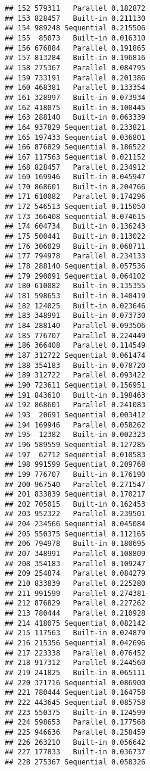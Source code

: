 \documentclass[
]{article}
\begin{document}
\begin{verbatim}
## 152 579311   Parallel 0.182872
## 153 828457   Built-in 0.211130
## 154 989248 Sequential 0.215506
## 155  85073   Built-in 0.016310
## 156 676884   Parallel 0.191865
## 157 813284   Built-in 0.196816
## 158 275367   Parallel 0.084795
## 159 733191   Parallel 0.201386
## 160 468381   Parallel 0.133354
## 161 328997   Built-in 0.073934
## 162 418075   Built-in 0.100445
## 163 288140   Built-in 0.063339
## 164 937829 Sequential 0.233821
## 165 197433 Sequential 0.036801
## 166 876829 Sequential 0.186522
## 167 117563 Sequential 0.021152
## 168 828457   Parallel 0.234912
## 169 169946   Built-in 0.045947
## 170 868601   Built-in 0.204766
## 171 610082   Parallel 0.174296
## 172 546513 Sequential 0.115050
## 173 366408 Sequential 0.074615
## 174 604734   Built-in 0.136243
## 175 500441   Built-in 0.113022
## 176 306029   Built-in 0.068711
## 177 794978   Parallel 0.234133
## 178 288140 Sequential 0.057536
## 179 290091 Sequential 0.064102
## 180 610082   Built-in 0.135355
## 181 598653   Built-in 0.140419
## 182 124025   Built-in 0.023646
## 183 348991   Built-in 0.073730
## 184 288140   Parallel 0.093506
## 185 776707   Parallel 0.224449
## 186 366408   Parallel 0.114549
## 187 312722 Sequential 0.061474
## 188 354183   Built-in 0.078720
## 189 312722   Parallel 0.093422
## 190 723611 Sequential 0.156951
## 191 843610   Built-in 0.198463
## 192 868601   Parallel 0.241083
## 193  20691 Sequential 0.003412
## 194 169946   Parallel 0.058262
## 195  12382   Built-in 0.002323
## 196 589559 Sequential 0.127285
## 197  62712 Sequential 0.010583
## 198 991599 Sequential 0.209768
## 199 776707   Built-in 0.176190
## 200 967540   Parallel 0.271547
## 201 833839 Sequential 0.170217
## 202 705015   Built-in 0.162453
## 203 952322   Parallel 0.239501
## 204 234566 Sequential 0.045084
## 205 550375 Sequential 0.112165
## 206 794978   Built-in 0.180695
## 207 348991   Parallel 0.108809
## 208 354183   Parallel 0.109247
## 209 254874   Parallel 0.084279
## 210 833839   Parallel 0.225280
## 211 991599   Parallel 0.274381
## 212 876829   Parallel 0.227262
## 213 780444   Parallel 0.210928
## 214 418075 Sequential 0.082142
## 215 117563   Built-in 0.024879
## 216 215356 Sequential 0.042696
## 217 223338   Parallel 0.076452
## 218 917312   Parallel 0.244560
## 219 241825   Built-in 0.065111
## 220 371716 Sequential 0.086900
## 221 780444 Sequential 0.164758
## 222 443645 Sequential 0.085758
## 223 550375   Built-in 0.124599
## 224 598653   Parallel 0.177568
## 225 946636   Parallel 0.258459
## 226 263210   Built-in 0.056642
## 227 177833   Built-in 0.036737
## 228 275367 Sequential 0.058326

\end{verbatim}
\end{document}
